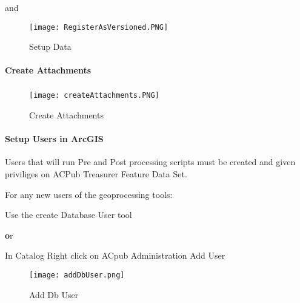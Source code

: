  and
 \vspace{.2in}

 \vspace{.2in}

 \begin{figure}[h!]
 \centering
     \texttt{[image: RegisterAsVersioned.PNG]}
 \caption{Setup Data}
 \end{figure}
 \clearpage
 \paragraph[Create Attachments]{\Large Create Attachments\texorpdfstring{\\}{}}

 \vspace{.3in}

 \subparagraph*{}
 \begin{figure}[h!]
 \centering
     \texttt{[image: createAttachments.PNG]}
 \caption{Create Attachments}
 \end{figure}
 \clearpage
 \paragraph[Setup Users in ArcGIS]{\Large Setup Users in ArcGIS\texorpdfstring{\\}{}}

 Users that will run Pre and Post processing scripts must be created and given priviliges on ACPub Treasurer Feature Data Set.
 \vspace{.35in}

 \noindent For any new users of the geoprocessing tools:
 
 \vspace{.15in}

 Use the create Database User tool 
  \vspace{.15in}
  
 {\textbf or}
 
 \vspace{.15in}

In Catalog \rtArrow Right click on ACpub \rtArrow Administration \rtArrow Add User
 
 \vspace{.35in}
 
 \begin{figure}[h!]
 \centering
     \texttt{[image: addDbUser.png]}
 \caption{Add Db User}
 \end{figure}
 \clearpage
